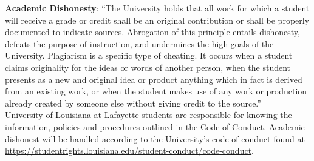 \documentclass[11pt]{article}
\begin{document}
{\bf Academic Dishonesty}: ``The University holds that all work for which a student will receive a grade or credit shall be an original contribution or shall be properly documented to indicate sources. Abrogation of this principle entails dishonesty, defeats the purpose of instruction, and undermines the high goals of the University.​ Plagiarism is a specific type of cheating. It occurs when a student claims originality for the ideas or words of another person, when the student presents as a new and original idea or product anything which in fact is derived from an existing work, or when the student makes use of any work or production already created by someone else without giving credit to the source.''\\

University of Louisiana at Lafayette students are responsible for knowing the information, policies and procedures outlined in the Code of Conduct.
Academic dishonest will be handled according to the University’s code of conduct found at
\href{https://studentrights.louisiana.edu/student-conduct/code-conduct}{https://studentrights.louisiana.edu/student-conduct/code-conduct}.\\

\newpage

       
    



\end{document}
